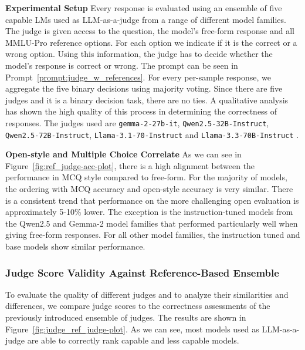 \textbf{Experimental Setup} Every response is evaluated using an ensemble of five capable LMs used as LLM-as-a-judge from a range of different model families. The judge is given access to the question, the model's free-form response and all MMLU-Pro reference options. For each option we indicate if it is the correct or a wrong option. Using this information, the judge has to decide whether the model's response is correct or wrong. The prompt can be seen in Prompt~\ref{prompt:judge_w_references}. For every per-sample response, we aggregate the five binary decisions using majority voting. Since there are five judges and it is a binary decision task, there are no ties. A qualitative analysis has shown the high quality of this process in determining the correctness of responses. The judges used are \texttt{gemma-2-27b-it}, \texttt{Qwen2.5-32B-Instruct}, \texttt{Qwen2.5-72B-Instruct}, \texttt{Llama-3.1-70-Instruct} and \texttt{Llama-3.3-70B-Instruct} \citep{gemmateam2024gemma2improvingopen, qwen2025qwen25technicalreport, grattafiori2024llama3herdmodels, meta2024llama33}. 

\textbf{Open-style and Multiple Choice Correlate} As we can see in Figure~\ref{fig:ref_judge-acc-plot}, there is a high alignment between the performance in MCQ style compared to free-form. For the majority of models, the ordering with MCQ accuracy and open-style accuracy is very similar. There is a consistent trend that performance on the more challenging open evaluation is approximately 5-10\% lower. The exception is the instruction-tuned models from the Qwen2.5 and Gemma-2 model families that performed particularly well when giving free-form responses. For all other model families, the instruction tuned and base models show similar performance. 

\subsubsection{Judge Score Validity Against Reference-Based Ensemble}

To evaluate the quality of different judges and to analyze their similarities and differences, we compare judge scores to the correctness assessments of the previously introduced ensemble of judges. The results are shown in Figure~\ref{fig:judge_ref_judge-plot}. As we can see, most models used as LLM-as-a-judge are able to correctly rank capable and less capable models. 

